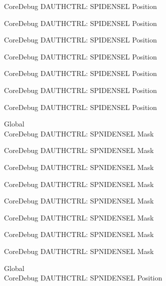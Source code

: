 \begin{DoxyRefList}
\label{deprecated__deprecated000145}%
%
Core\+Debug DAUTHCTRL\+: SPIDENSEL Position 

\label{deprecated__deprecated000221}%
%
Core\+Debug DAUTHCTRL\+: SPIDENSEL Position 

\label{deprecated__deprecated000284}%
%
Core\+Debug DAUTHCTRL\+: SPIDENSEL Position 

\label{deprecated__deprecated000363}%
%
Core\+Debug DAUTHCTRL\+: SPIDENSEL Position 

\label{deprecated__deprecated000439}%
%
Core\+Debug DAUTHCTRL\+: SPIDENSEL Position 

\label{deprecated__deprecated000542}%
%
Core\+Debug DAUTHCTRL\+: SPIDENSEL Position 

\label{deprecated__deprecated000644}%
%
Core\+Debug DAUTHCTRL\+: SPIDENSEL Position  
\item[Global \doxylink{group___c_m_s_i_s___s_c_b_gaabb5d6c750c9ec50254134ece2111dcd}{Core\+Debug\+\_\+\+DAUTHCTRL\+\_\+\+SPNIDENSEL\+\_\+\+Msk} ]\hfill \\
\label{deprecated__deprecated000088}%
%
Core\+Debug DAUTHCTRL\+: SPNIDENSEL Mask 

\label{deprecated__deprecated000142}%
%
Core\+Debug DAUTHCTRL\+: SPNIDENSEL Mask 

\label{deprecated__deprecated000218}%
%
Core\+Debug DAUTHCTRL\+: SPNIDENSEL Mask 

\label{deprecated__deprecated000281}%
%
Core\+Debug DAUTHCTRL\+: SPNIDENSEL Mask 

\label{deprecated__deprecated000360}%
%
Core\+Debug DAUTHCTRL\+: SPNIDENSEL Mask 

\label{deprecated__deprecated000436}%
%
Core\+Debug DAUTHCTRL\+: SPNIDENSEL Mask 

\label{deprecated__deprecated000539}%
%
Core\+Debug DAUTHCTRL\+: SPNIDENSEL Mask 

\label{deprecated__deprecated000641}%
%
Core\+Debug DAUTHCTRL\+: SPNIDENSEL Mask  
\item[Global \doxylink{group___c_m_s_i_s___s_c_b_ga866734a8e4bec2d6cf091e265c6c0f3d}{Core\+Debug\+\_\+\+DAUTHCTRL\+\_\+\+SPNIDENSEL\+\_\+\+Pos} ]\hfill \\
\label{deprecated__deprecated000087}%
%
Core\+Debug DAUTHCTRL\+: SPNIDENSEL Position 


\end{DoxyRefList}

